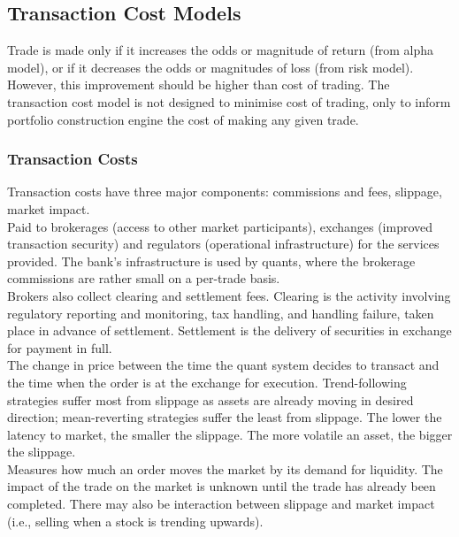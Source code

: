 \subsection{Transaction Cost Models}

Trade is made only if it increases the odds or magnitude of return (from alpha model), or if it decreases the odds or magnitudes of loss (from risk model). However, this improvement should be higher than cost of trading. The transaction cost model is not designed to minimise cost of trading, only to inform portfolio construction engine the cost of making any given trade.

\subsubsection{Transaction Costs}

Transaction costs have three major components: commissions and fees, slippage, market impact.\\

 Paid to brokerages (access to other market participants), exchanges (improved transaction security) and regulators (operational infrastructure) for the services provided. The bank's infrastructure is used by quants, where the brokerage commissions are rather small on a per-trade basis.\\
Brokers also collect clearing and settlement fees. Clearing is the activity involving regulatory reporting and monitoring, tax handling, and handling failure, taken place in advance of settlement. Settlement is the delivery of securities in exchange for payment in full.\\

 The change in price between the time the quant system decides to transact and the time when the order is at the exchange for execution. Trend-following strategies suffer most from slippage as assets are already moving in desired direction; mean-reverting strategies suffer the least from slippage. The lower the latency to market, the smaller the slippage. The more volatile an asset, the bigger the slippage.\\

 Measures how much an order moves the market by its demand for liquidity. The impact of the trade on the market is unknown until the trade has already been completed. There may also be interaction between slippage and market impact (i.e., selling when a stock is trending upwards).

